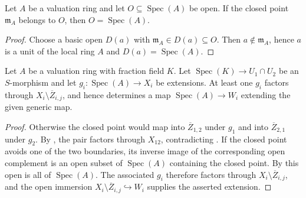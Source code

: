 \begin{lemma}
  \label{lemma:nagata-valuation-open-closed-point}

  Let $A$ be a valuation ring and let $O\subseteq\operatorname{Spec}(A)$ be
  open.  If the closed point $\mathfrak m_A$ belongs to $O$, then
  $O=\operatorname{Spec}(A)$.
\end{lemma}

\begin{proof}
  Choose a basic open $D(a)$ with $\mathfrak m_A\in D(a)\subseteq O$.
  Then $a\notin\mathfrak m_A$, hence $a$ is a unit of the local ring $A$ and
  $D(a)=\operatorname{Spec}(A)$.
\end{proof}

\begin{lemma}
  \label{lemma:nagata-one-valuation-avoids-boundary}

  Let $A$ be a valuation ring with fraction field $K$.  Let
  $\operatorname{Spec}(K)\to U_1\cap U_2$ be an $S$-morphism and let
  $g_i\colon\operatorname{Spec}(A)\to X_i$ be extensions.  At least one
  $g_i$ factors through $X_i\setminus\overline Z_{i,j}$, and hence determines
  a map $\operatorname{Spec}(A)\to W_i$ extending the given generic map.
\end{lemma}

\begin{proof}
  Otherwise the closed point would map into $\overline Z_{1,2}$ under $g_1$
  and into $\overline Z_{2,1}$ under $g_2$.  By
  , the pair factors
  through $X_{12}$, contradicting
  .  If the closed point avoids
  one of the two boundaries, its inverse image of the corresponding open
  complement is an open subset of $\operatorname{Spec}(A)$ containing the
  closed point.  By
   this open is all of
  $\operatorname{Spec}(A)$.  The associated $g_i$ therefore factors
  through $X_i\setminus\overline Z_{i,j}$, and the open immersion
  $X_i\setminus\overline Z_{i,j}\hookrightarrow W_i$ supplies the asserted
  extension.
\end{proof}

